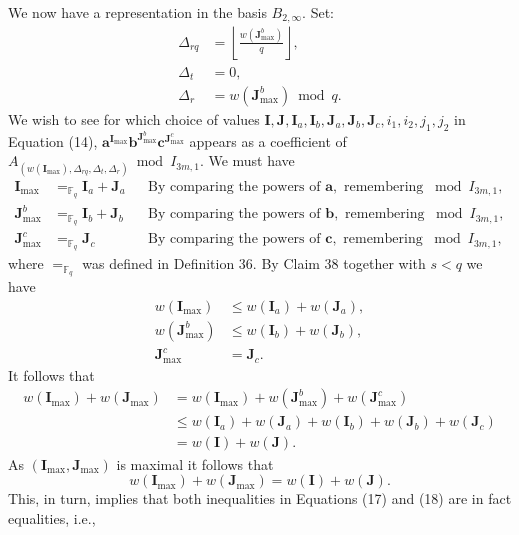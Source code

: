 \documentclass[10pt,a4paper]{article}
\begin{document}
We now have a representation in the basis $B_{2,\infty}$.
Set:
\begin{align*}
\Delta_{rq}&=\left\lfloor\frac{w(\boldsymbol J_{\max}^b)}q\right\rfloor,\\
\Delta_t&=0,\\
\Delta_r&=w(\boldsymbol J_{\max}^b)\bmod q.\tag{16}
\end{align*}
We wish to see for which choice of values $\boldsymbol I,\boldsymbol J,\boldsymbol I_a,\boldsymbol I_b,\boldsymbol J_a,\boldsymbol J_b,\boldsymbol J_c,i_1,i_2,j_1,j_2$ in Equation (14), $\boldsymbol a^{\boldsymbol I_{\max}}\boldsymbol b^{\boldsymbol J_{\max}^b}\boldsymbol c^{\boldsymbol J_{\max}^c}$ appears as a coefficient of $A_{(w(\boldsymbol I_{\max}),\Delta_{rq},\Delta_t,\Delta_r)}\bmod I_{3m,1}$. We must have
\begin{align*}
\boldsymbol I_{\max}&=_{\mathbb F_q}\boldsymbol I_a+\boldsymbol J_a&&\text{By comparing the powers of }\boldsymbol a,\text{ remembering }\bmod I_{3m,1},\\
\boldsymbol J_{\max}^b&=_{\mathbb F_q}\boldsymbol I_b+\boldsymbol J_b&&\text{By comparing the powers of }\boldsymbol b,\text{ remembering }\bmod I_{3m,1},\\
\boldsymbol J_{\max}^c&=_{\mathbb F_q}\boldsymbol J_c&&\text{By comparing the powers of }\boldsymbol c,\text{ remembering }\bmod I_{3m,1},
\end{align*}
where $=_{\mathbb F_q}$ was defined in Definition 36.
By Claim 38 together with $s<q$ we have
\begin{align*}
w(\boldsymbol I_{\max})&\leq w(\boldsymbol I_a)+w(\boldsymbol J_a),\tag{17}\\
w(\boldsymbol J_{\max}^b)&\leq w(\boldsymbol I_b)+w(\boldsymbol J_b),\tag{18}\\
\boldsymbol J_{\max}^c&=\boldsymbol J_c.\tag{19}
\end{align*}
It follows that
\begin{align*}
w(\boldsymbol I_{\max})+w(\boldsymbol J_{\max})
&=w(\boldsymbol I_{\max})+w(\boldsymbol J_{\max}^b)+w(\boldsymbol J_{\max}^c)\\
&\leq w(\boldsymbol I_a)+w(\boldsymbol J_a)+w(\boldsymbol I_b)+w(\boldsymbol J_b)+w(\boldsymbol J_c)\\
&=w(\boldsymbol I)+w(\boldsymbol J).
\end{align*}
As $(\boldsymbol I_{\max},\boldsymbol J_{\max})$ is maximal it follows that
\[w(\boldsymbol I_{\max})+w(\boldsymbol J_{\max})=w(\boldsymbol I)+w(\boldsymbol J).\tag{20}\]
This, in turn, implies that both inequalities in Equations (17) and (18) are in fact equalities, i.e.,
\end{document}
